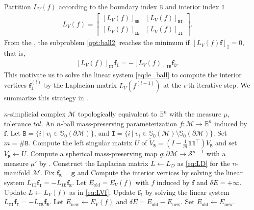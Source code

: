 \documentclass{article}
\begin{document}
Partition $L_V(f)$ according to the boundary index $\mathtt{B}$ and interior index $\mathtt{I}$
\begin{align}
    L_V(f) = \begin{bmatrix}
        [L_V(f)]_{\mathtt{B}\mathtt{B}} & [L_V(f)]_{\mathtt{B}\mathtt{I}}\\
        [L_V(f)]_{\mathtt{I}\mathtt{B}} &
        [L_V(f)]_{\mathtt{I}\mathtt{I}}
    \end{bmatrix}.
\end{align}
From the , the subproblem \eqref{opt:ball2} reaches the minimum if $[L_V(f)\mathbf{f}]_\mathtt{I} = 0$, that is,
\begin{align} \label{eq:le_ball}
    [L_V(f)]_{\mathtt{I}\mathtt{I}} \mathbf{f}_{\mathtt{I}} = -[L_V(f)]_{\mathtt{I}\mathtt{B}} \mathbf{f}_{\mathtt{B}}.
\end{align}
This motivate us to solve the linear system \eqref{eq:le_ball} to compute the interior vertices $\mathbf{f}_\mathtt{I}^{(i)}$ by the Laplacian matrix $L_V(f^{(i-1)})$ at the $i$-th iterative step. We summarize this strategy in .

\begin{algorithm}[h]
\caption{$n$-VSEM for the $n$-ball mass-preserving parameterization}
\begin{algorithmic}[1] \label{alg:BMP}
    \REQUIRE $n$-simplicial complex $\mathcal{M}$ topologically equivalent to $\mathbb{B}^{n}$ with the measure $\mu$, tolerance $tol$.
    \ENSURE An $n$-ball mass-preserving parameterization $f: \mathcal{M}\to \mathbb{B}^{n}$ induced by $\mathbf{f}$.
    \STATE Let $\mathtt{B} = \{ i~|~ v_i \in \mathbb{S}_0(\partial \mathcal{M})\}$, and $\mathtt{I} = \{ i~|~ v_i \in \mathbb{S}_0(\mathcal{M}) \setminus \mathbb{S}_0(\partial \mathcal{M})\}$. Set $m = \# \mathtt{B}$.
    \STATE Compute the left singular matrix $U$ of $\tilde{V}_\mathtt{B} = (I - \frac{1}{m}\mathbf{1}\mathbf{1}^\top) V_\mathtt{B}$ and set $V_\mathtt{B} \gets U$.
    \STATE Compute a spherical mass-preserving map $g:\partial \mathcal{M} \to \mathcal{S}^{n-1}$ with a measure $\mu'$ by .
    \STATE Construct the Laplacian matrix $L \gets L_D$ as \eqref{eq:LD} for the $n$-manifold $\mathcal{M}$.
    \STATE Fix $\mathbf{f}_\mathtt{B} = \mathbf{g}$ and Compute the interior vertices by solving the linear system
    $
        L_{\mathtt{I}\mathtt{I}} \mathbf{f}_{\mathtt{I}} = -L_{\mathtt{I}\mathtt{B}} \mathbf{f}_{\mathtt{B}}.
    $
    \STATE Let $E_\text{old} = E_V(f)$ with $f$ induced by $\mathbf{f}$ and $\delta E = +\infty$.
    \STATE Update $L \gets L_V(f)$ as in \eqref{eq:LVf}.
    \STATE Update $\mathbf{f}_\mathtt{I}$ by solving the linear system
    $
        L_{\mathtt{I}\mathtt{I}} \mathbf{f}_{\mathtt{I}} = -L_{\mathtt{I}\mathtt{B}} \mathbf{f}_{\mathtt{B}}.
    $
    \STATE Let $E_\text{new} \gets E_V(f)$ and $\delta E = E_\text{old} - E_\text{new}$. Set $E_\text{old} \gets E_\text{new}$.
    \ENDWHILE
\end{algorithmic}
\end{algorithm}
\end{document}
